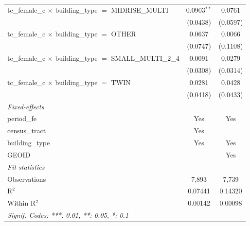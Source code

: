 \begin{tabular}{lcc}
   tc\_female\_c $\times$ building\_type $=$ MIDRISE\_MULTI            & 0.0903$^{**}$  & 0.0761\\   
                                                                       & (0.0438)       & (0.0597)\\   
   tc\_female\_c $\times$ building\_type $=$ OTHER                     & 0.0637         & 0.0066\\   
                                                                       & (0.0747)       & (0.1108)\\   
   tc\_female\_c $\times$ building\_type $=$ SMALL\_MULTI\_2\_4        & 0.0091         & 0.0279\\   
                                                                       & (0.0308)       & (0.0314)\\   
   tc\_female\_c $\times$ building\_type $=$ TWIN                      & 0.0281         & 0.0428\\   
                                                                       & (0.0418)       & (0.0433)\\   
   \midrule
   \emph{Fixed-effects}\\
   period\_fe                                                          & Yes            & Yes\\  
   census\_tract                                                       & Yes            & \\  
   building\_type                                                      & Yes            & Yes\\  
   GEOID                                                               &                & Yes\\  
   \midrule
   \emph{Fit statistics}\\
   Observations                                                        & 7,893          & 7,739\\  
   R$^2$                                                               & 0.07441        & 0.14320\\  
   Within R$^2$                                                        & 0.00142        & 0.00098\\  
   \midrule \midrule
   \multicolumn{3}{l}{\emph{Signif. Codes: ***: 0.01, **: 0.05, *: 0.1}}\\
\end{tabular}
\par\endgroup
\begingroup
\centering
